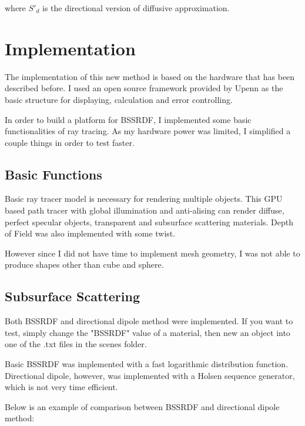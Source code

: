 \documentclass[11pt]{article}
\begin{document}
where $S'_d$ is the directional version of diffusive approximation.


\section{Implementation}
\label{sec:orgheadline7}
The implementation of this new method is based on the hardware that has been described before. 
I used an open source  framework provided by Upenn as the basic structure for displaying, calculation 
and error controlling. 

In order to build a platform for BSSRDF, I implemented some basic functionalities of ray tracing. As my hardware power was limited, 
I simplified a couple things in order to test faster. 
\subsection{Basic Functions}
\label{sec:orgheadline5}
Basic ray tracer model is necessary for rendering multiple objects. This GPU based path tracer with global illumination and anti-alising 
can render diffuse, perfect specular objects, transparent and subsurface scattering materials. Depth of Field was also implemented 
with some twist.

However since I did not have time to implement mesh geometry, I was not able to produce shapes other than cube and sphere.  
\subsection{Subsurface Scattering}
\label{sec:orgheadline6}
Both BSSRDF and directional dipole method were implemented. If you want to test, simply change the "BSSRDF" value of a material, then new an object into 
one of the .txt files in the scenes folder. 

Basic BSSRDF was implemented with a fast logarithmic distribution function. Directional dipole, however, was implemented with a 
Holsen sequence  generator, which is not very time efficient.

Below is an example of comparison between BSSRDF and directional dipole method:
\end{document}
